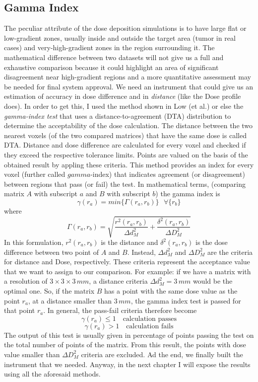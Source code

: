 \documentclass[12pt, a4paper, twoside]{book}
\begin{document}
\subsection{Gamma Index}
\label{sec:gam}
The peculiar attribute of the dose deposition simulations is to have large flat or low-gradient zones, usually inside and outside the target area (tumor in real cases) and very-high-gradient zones in the region surrounding it.
The mathematical difference between two datasets will not give us a full and exhaustive comparison because it could highlight an area of significant disagreement near high-gradient regions and a more quantitative assessment may be needed for final system approval.   
We need an instrument that could give us an estimation of accuracy in dose difference and in \emph{distance} (like the Dose profile does).
In order to get this, I used the method shown in Low (et al.) \cite{low:gamma} or else the \emph{gamma-index test} that uses a distance-to-agreement (DTA) distribution to determine the acceptability of the dose calculation. 
The distance between the two nearest voxels (of the two compared matrices) that have the same dose is called DTA. Distance and dose difference are calculated for every voxel and checked if they exceed the respective tolerance limits. Points are valued on the basis of the obtained result by appling these criteria. This method provides an index for every voxel (further called $gamma$-index) that indicates agreement (or disagreement) between regions that pass (or fail) the test.
In mathematical terms, (comparing matrix $A$ with subscript $a$ and $B$ with subscript $b$) the gamma index is
\[
\gamma(r_a) = min\{\Gamma(r_a,r_b) \}\,\,\,\,\forall\{ r_b\}
\]
where
\[
\Gamma(r_a,r_b) = \sqrt{\frac{r^2(r_a,r_b)}{\Delta d^2_M} + \frac{\delta^2(r_a,r_b)}{\Delta D^2_M}}
\]
In this formulation, $r^2(r_a,r_b)$ is the distance and $\delta^2(r_a,r_b)$ is the dose difference between two point of $A$ and $B$. Instead, $\Delta d^2_M$ and $\Delta D^2_M$ are the criteria for distance and Dose, respectively.
These criteria represent the acceptance value that we want to assign to our comparison. For example: if we have a matrix with a resolution of $3\times3\times3\,mm$, a distance criteria $\Delta d^2_M = 3\,mm$ would be the optimal one. So, if the matrix $B$ has a point with the same dose value as the point $r_a$, at a distance smaller than $3\,mm$, the gamma index test is passed for that point $r_a$.
In general, the pass-fail criteria therefore become
\[
\gamma(r_a)\leq1\,\,\,\,\,\,\textrm{calculation passes}
\]
\[
\gamma(r_a)>1\,\,\,\,\,\,\textrm{calculation fails}
\]
The output of this test is usually given in percentage of points passing the test on the total number of points of the matrix.
From this result, the points with dose value smaller than $\Delta D^2_M$ criteria are excluded.
Ad the end, we finally built the instrument that we needed. Anyway, in the next chapter I will expose the results using all the aforesaid methods.
\end{document}
